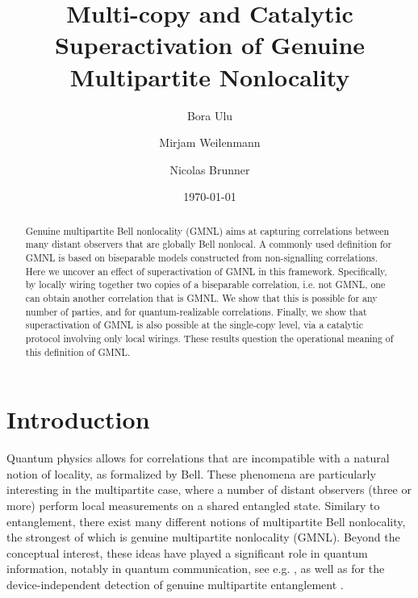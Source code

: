 \documentclass[pra,aps,reprint,superscriptaddress]{revtex4-2}
\theoremstyle{theorem}
\begin{document}
\title{Multi-copy and Catalytic Superactivation of Genuine Multipartite Nonlocality}

\author{Bora Ulu}


\author{Mirjam Weilenmann}

\author{Nicolas Brunner}

\date{\today}

\begin{abstract}
Genuine multipartite Bell nonlocality (GMNL) aims at capturing correlations between many distant observers that are globally Bell nonlocal. A commonly used definition for GMNL is based on biseparable models constructed from non-signalling correlations. Here we uncover an effect of superactivation of GMNL in this framework. Specifically, by locally wiring together two copies of a biseparable correlation, i.e. not GMNL, one can obtain another correlation that is GMNL. We show that this is possible for any number of parties, and for quantum-realizable correlations. Finally, we show that superactivation of GMNL is also possible at the single-copy level, via a catalytic protocol involving only local wirings. These results question the operational meaning of this definition of GMNL. 
   
\end{abstract}

\maketitle

\section{Introduction}

Quantum physics allows for correlations that are incompatible with a natural notion of locality, as formalized by Bell. These phenomena are particularly interesting in the multipartite case, where a number of distant observers (three or more) perform local measurements on a shared entangled state. Similary to entanglement, there exist many different notions of multipartite Bell nonlocality, the strongest of which is genuine multipartite nonlocality (GMNL). Beyond the conceptual interest, these ideas have played a significant role in quantum information, notably in quantum communication, see e.g. \cite{Scarani2001,Ribeiro2018,Holz2020,Grasselli_2023}, as well as for the device-independent detection of genuine multipartite entanglement \cite{bancal2011_diew}. 
\end{document}

